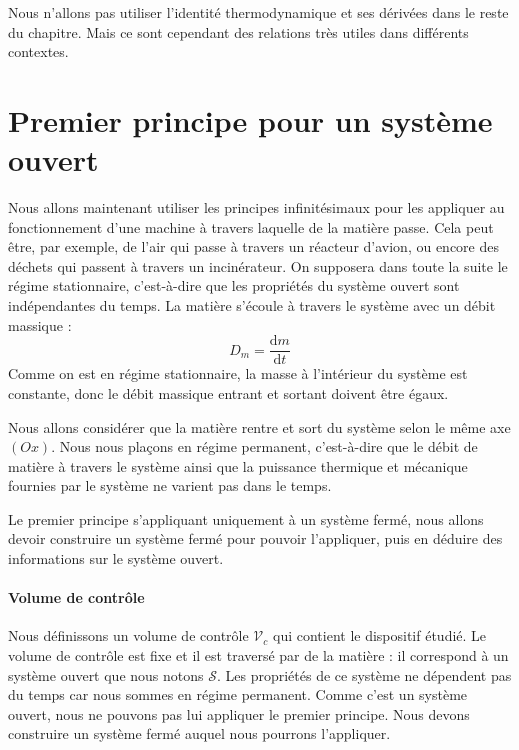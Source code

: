 \documentclass[11pt,fleqn]{book} %
\newcommand{\dd}{\mathrm{d}}
\begin{document}
\begin{remark}
    Nous n'allons pas utiliser l'identité thermodynamique et ses dérivées dans le reste du chapitre. Mais ce sont cependant des relations très utiles dans différents contextes.
\end{remark}

\section{Premier principe pour un système ouvert}

Nous allons maintenant utiliser les principes infinitésimaux pour les appliquer au fonctionnement d'une machine à travers laquelle de la matière passe. Cela peut être, par exemple, de l'air qui passe à travers un réacteur d'avion, ou encore des déchets qui passent à travers un incinérateur. On supposera dans toute la suite le régime stationnaire, c'est-à-dire que les propriétés du système ouvert sont indépendantes du temps. La matière s'écoule à travers le système avec un débit massique :
\begin{equation}
    D_m = \frac{\dd m}{\dd t}
\end{equation}
Comme on est en régime stationnaire, la masse à l'intérieur du système est constante, donc le débit massique entrant et sortant doivent être égaux.

 Nous allons considérer que la matière rentre et sort du système selon le même axe $(Ox)$. Nous nous plaçons en régime permanent, c'est-à-dire que le débit de matière à travers le système ainsi que la puissance thermique et mécanique fournies par le système ne varient pas dans le temps.

Le premier principe s'appliquant uniquement à un système fermé, nous allons devoir construire un système fermé pour pouvoir l'appliquer, puis en déduire des informations sur le système ouvert.

\paragraph{Volume de contrôle}

Nous définissons un volume de contrôle $\mathcal{V}_c$ qui contient le dispositif étudié. Le volume de contrôle est fixe et il est traversé par de la matière : il correspond à un système ouvert que nous notons $\mathcal{S}$. Les propriétés de ce système ne dépendent pas du temps car nous sommes en régime permanent. Comme c'est un système ouvert, nous ne pouvons pas lui appliquer le premier principe. Nous devons construire un système fermé auquel nous pourrons l'appliquer.
\end{document}
